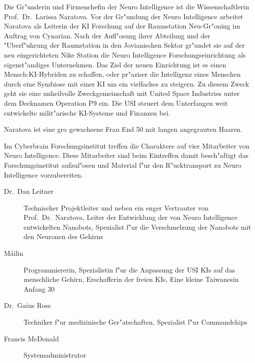 \renewcommand{\ml}{\pinyin{Mailin2}}


Die Gr"underin und Firmenchefin der Neuro Intelligence ist die Wissenschaftlerin Prof.~Dr.~Larissa Naratova. Vor der Gr"undung der Neuro Intelligence arbeitet Naratova als Leiterin der KI Forschung auf der Raumstation Neu-Gr"oning im Auftrag von Cynarian. Nach der Aufl"osung ihrer Abteilung und der "Uberf"uhrung der Raumstation in den Jovianischen Sektor gr"undet sie auf der neu eingerichteten Nike Station die Neuro Intelligence Forschungseinrichtung als eigenst"andiges Unternehmen. Das Ziel der neuen Einrichtung ist es einen Mensch-KI-Hybriden zu schaffen, oder pr"aziser die Intelligenz eines Menschen durch eine Symbiose mit einer KI um ein vielfaches zu steigern. Zu diesem Zweck  geht sie eine unheilvolle Zweckgemeinschaft mit United Space Industries unter dem Decknamen Operation P9 ein. Die USI steuert dem Unterfangen weit entwickelte milit"arische KI-Systeme und Finanzen bei.

Naratova ist eine gro\3 gewachsene Frau End 50 mit langen angegrauten Haaren. 


Im Cyberbrain Forschungsinstitut treffen die Charaktere auf vier Mitarbeiter von Neuro Intelligence. Diese Mitarbeiter sind beim Eintreffen damit besch"aftigt das Forschungsinstitut aufzul"osen und Material f"ur den R"ucktransport zu Neuro Intelligence vorzubereiten.

\begin{description}
    \item[Dr.~Dan Leitner] Technischer Projektleiter und neben \ml{} ein enger Vertrauter von Prof.~Dr.~Naratova, Leiter der Entwicklung 
        der von Neuro Intelligence entwickelten Nanobots, Spezialist f"ur die Verschmelzung  der  Nanobots mit den Neuronen des Gehirns
    \item[M\'{a}ilin] Programmiererin, Spezialistin f"ur die Anpassung der USI KIs auf das menschliche Gehirn, Erschafferin der freien KIs, 
        Eine kleine Taiwanesin Anfang 30
    \item[Dr.~Gaius Ross] Techniker f"ur medizinische Ger"atschaften, Spezialist f"ur Commandchips
    \item[Francis McDonald] Systemadministrator
\end{description}
\vfill\newpage


